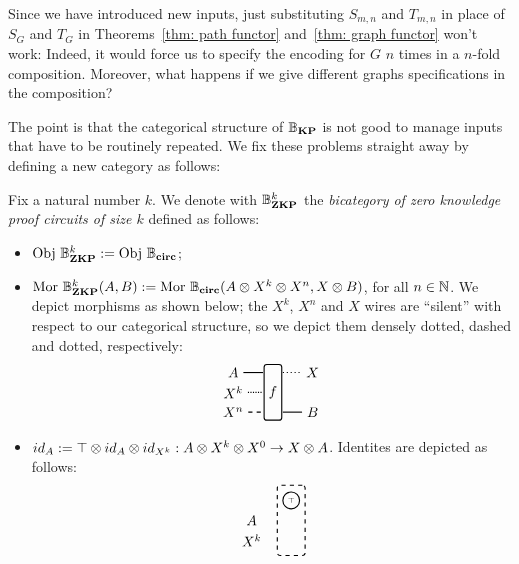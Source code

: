 \documentclass[submission,copyright,creativecommons,sharealike,noncommercial]{eptcs}
\begin{document}
Since we have introduced new inputs, just substituting $S_{m,n}$ 
and $T_{m,n}$ in place of $S_G$ and $T_G$ in 
Theorems~\ref{thm: path functor} and~\ref{thm: graph functor}
won't work: Indeed, it would force us to specify the encoding
for $G$ $n$ times in a $n$-fold composition. Moreover, what happens 
if we give different graphs specifications in the composition?

The point is that the categorical structure 
of $\mathbb{B}_\textbf{KP}$ is not good to manage inputs that have to be 
routinely repeated. We fix these problems straight away 
by defining a new category as follows:
%
%
\begin{definition}\label{def: definition of bzkp}
  Fix a natural number $k$. We denote with $\mathbb{B}^{k}_\textbf{ZKP}$ 
  the \emph{bicategory of zero knowledge proof circuits of size $k$} defined 
  as follows:
  \begin{itemize}
    \item $\operatorname{Obj} \, \mathbb{B}^{k}_\textbf{ZKP} := \operatorname{Obj} \, \mathbb{B}_\textbf{circ}$;
    \item $\operatorname{Mor} \, \mathbb{B}^{k}_\textbf{ZKP}(A,B) := \operatorname{Mor} \, \mathbb{B}_\textbf{circ}(A \otimes X^k \otimes X^n, X \otimes B )$, for all $n \in \mathbb{N}$.
    We depict morphisms as shown below; the $X^k$, $X^n$ and $X$ wires are ``silent'' with respect to 
    our categorical structure, so we depict them densely dotted, dashed and dotted, respectively:
    \begin{equation*}
    \begin{tikzpicture}
      \node[draw, minimum height=40, minimum width=5, rounded corners=2, thick] (f) at (-1,0.5) {$f$};
      \node (A) at (-2,1) {$A$};
      \node (Xk0) at (-2,0.5) {$X^{k}$};
      \node (Xn0) at (-2,0) {$X^{n}$};

      \node (Bf) at (0,1) {$X$};
      \node (B) at (0,0) {$B$};

      \draw[thick] (A) -- (-1.25,1);
      \draw[densely dotted,thick] (Xk0) -- (-1.25,0.5);
      \draw[dashed,thick] (Xn0) -- (-1.25,0);

      \draw[dotted,thick] (-0.75,1) -- (Bf);
      \draw[thick] (-0.75,0) -- (B);
    \end{tikzpicture}  
    \end{equation*}
    \item $id_{A} := \top \otimes id_{A} \otimes id_{X^k}: A \otimes X^k \otimes X^0  \to X \otimes A$. Identites are
    depicted as follows:
    \begin{equation*}
    \begin{tikzpicture}
      \node[draw, dashed, minimum height=50, minimum width=20, rounded corners=2, thick] (f) at (-1,0.5) {};
      \node[thick, draw, circle, radius=2pt, inner sep = 2pt] (true) at (-1,1) {\tiny{$\top$}};
      \node (A) at (-2,0.5) {$A$};
      \node (Xk) at (-2,0) {$X^k$};


\end{tikzpicture}
\end{equation*}
\end{itemize}
\end{definition}
\end{document}
